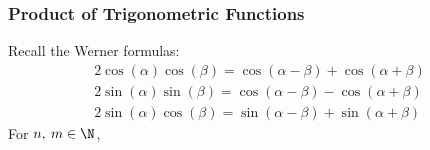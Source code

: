 \documentclass{article}
\begin{document}
\subsubsection{Product of Trigonometric Functions}
Recall the Werner formulas:
\begin{gather*}
    2 \cos{\left( \alpha \right)} \cos{\left( \beta \right)} = \cos{\left( \alpha - \beta \right)} + \cos{\left( \alpha + \beta \right)} \\
    2 \sin{\left( \alpha \right)} \sin{\left( \beta \right)} = \cos{\left( \alpha - \beta \right)} - \cos{\left( \alpha + \beta \right)} \\
    2 \sin{\left( \alpha \right)} \cos{\left( \beta \right)} = \sin{\left( \alpha - \beta \right)} + \sin{\left( \alpha + \beta \right)}
\end{gather*}
For \(n,\: m \in \N\),
\end{document}
